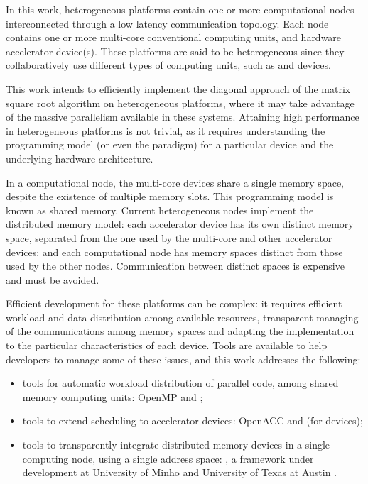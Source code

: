 
In this work, heterogeneous platforms contain one or more computational nodes interconnected through a low latency communication topology. Each node contains one or more multi-core conventional computing units, and hardware accelerator device(s). These platforms are said to be heterogeneous since they collaboratively use different types of computing units, such as \gpus and \intel\mic devices.

This work intends to efficiently implement the diagonal approach of the matrix square root algorithm on heterogeneous platforms, where it may take advantage of the massive parallelism available in these systems. Attaining high performance in heterogeneous platforms is not trivial, as it requires understanding the programming model (or even the paradigm) for a particular device and the underlying hardware architecture.

In a computational node, the multi-core \cpu devices share a single memory space, despite the existence of multiple memory slots.
This programming model is known as shared memory.
Current heterogeneous nodes implement the distributed memory model: each accelerator device has its own distinct memory space, separated from the one used by the multi-core and other accelerator devices; and each computational node has memory spaces distinct from those used by the other nodes. Communication between distinct spaces is expensive and must be avoided.

Efficient development for these platforms can be complex: it requires efficient workload and data distribution among available resources, transparent managing of the communications among memory spaces and adapting the implementation to the particular characteristics of each device. Tools are available to help developers to manage some of these issues, and this work addresses the following:
\begin{itemize}
	\item tools for automatic workload distribution of parallel code, among shared memory computing units: OpenMP and \tbb\cite{TBB};
	\item tools to extend scheduling to accelerator devices: \mbox{OpenACC\cite{OpenACC}} and \tbb (for \intel devices)\cite{MIC:TBB};
	\item tools to transparently integrate distributed memory devices in a single computing node, using a single address space: \gama, a framework under development at University of Minho and University of Texas at Austin \cite{Mariano:Alves:2012}.
\end{itemize}
